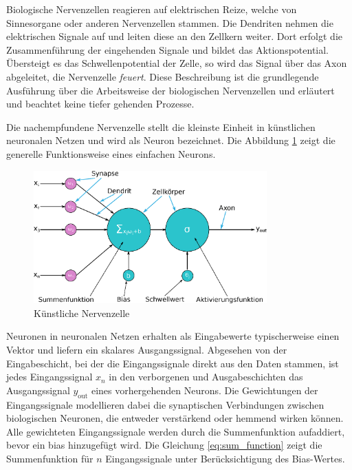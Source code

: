 Biologische Nervenzellen reagieren auf elektrischen Reize, welche von Sinnesorgane oder anderen Nervenzellen stammen. Die Dendriten nehmen die elektrischen Signale auf und leiten diese an den Zellkern weiter. Dort erfolgt die Zusammenführung der eingehenden Signale und bildet das Aktionspotential. Übersteigt es das Schwellenpotential der Zelle, so wird das Signal über das Axon abgeleitet, die Nervenzelle \glqq \textit{feuert}\grqq. Diese Beschreibung ist die grundlegende Ausführung über die Arbeitsweise der biologischen Nervenzellen und erläutert und beachtet keine tiefer gehenden Prozesse.\vspace{0.2cm}

Die nachempfundene Nervenzelle stellt die kleinste Einheit in künstlichen neuronalen Netzen und wird als Neuron bezeichnet. Die Abbildung \ref{img:artificial_neuron} zeigt die generelle Funktionsweise eines einfachen Neurons.

\begin{figure}[!ht]
	\includegraphics[width=0.8\textwidth]{content/chapter_basics/images/artificial_neuron.eps}
	\centering
	\caption{Künstliche Nervenzelle}
	\label{img:artificial_neuron}
\end{figure}

Neuronen in neuronalen Netzen erhalten als Eingabewerte typischerweise einen Vektor und liefern ein skalares Ausgangssignal. Abgesehen von der Eingabeschicht, bei der die Eingangssignale direkt aus den Daten stammen, ist jedes Eingangssignal $x_n$ in den verborgenen und Ausgabeschichten das Ausgangssignal $y_{\text{out}}$ eines vorhergehenden Neurons. Die Gewichtungen der Eingangssignale modellieren dabei die synaptischen Verbindungen zwischen biologischen Neuronen, die entweder verstärkend oder hemmend wirken können. Alle gewichteten Eingangssignale werden durch die Summenfunktion aufaddiert, bevor ein \gls{bias} hinzugefügt wird. Die Gleichung \ref{eq:sum_function} zeigt die Summenfunktion für $n$ Eingangssignale unter Berücksichtigung des Bias-Wertes.

